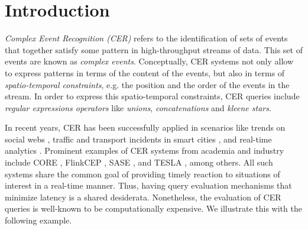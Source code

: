 \chapter{Introduction}\label{chapter:introduction}

\emph{Complex Event Recognition (CER)} refers to the identification of sets of events that together satisfy some pattern in high-throughput streams of data. This set of events are known as \emph{complex events}. Conceptually, CER systems not only allow to express patterns in terms of the content of the events, but also in terms of \emph{spatio-temporal constraints}, e.g. the position and the order of the events in the stream. In order to express this spatio-temporal constraints, CER queries include \emph{regular expressions operators} like \emph{unions}, \emph{concatenations} and \emph{kleene stars}.

In recent years, CER has been successfully applied in scenarios like trends on social webs \cite{survey-systems-1}, traffic and transport incidents in smart cities \cite{survey-systems-1}, and real-time analytics \cite{real-time-analytics}. Prominent examples of CER systems from academia and industry include CORE \cite{core}, FlinkCEP \cite{flink-cep}, SASE \cite{sase}, and TESLA \cite{tesla}, among others.  All such systems share the common goal of providing timely reaction to situations of interest in a real-time manner. Thus, having query evaluation mechanisms that minimize latency is a shared desiderata. Nonetheless, the evaluation of CER queries is well-known to be computationally expensive. We illustrate this with the following example.

